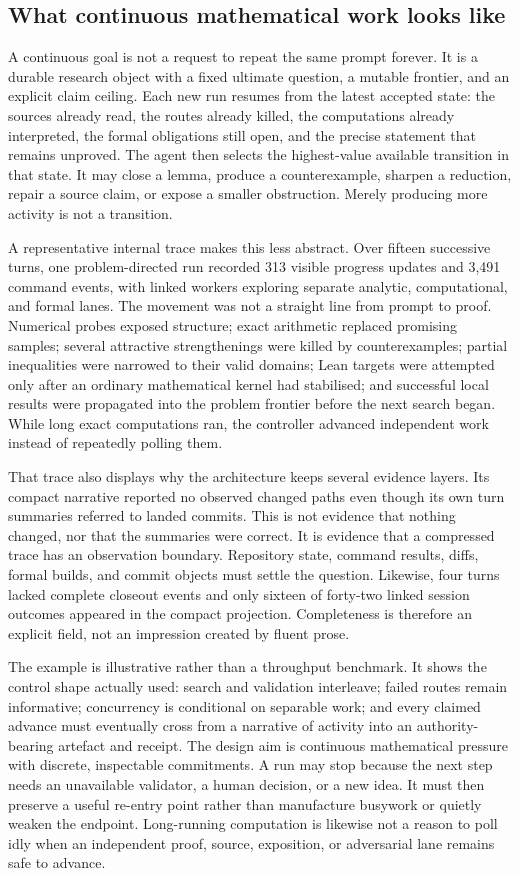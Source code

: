 \documentclass[10pt]{article}
\begin{document}
\subsection{What continuous mathematical work looks like}

A continuous goal is not a request to repeat the same prompt forever. It is a
durable research object with a fixed ultimate question, a mutable frontier,
and an explicit claim ceiling. Each new run resumes from the latest accepted
state: the sources already read, the routes already killed, the computations
already interpreted, the formal obligations still open, and the precise
statement that remains unproved. The agent then selects the highest-value
available transition in that state. It may close a lemma, produce a
counterexample, sharpen a reduction, repair a source claim, or expose a
smaller obstruction. Merely producing more activity is not a transition.

A representative internal trace makes this less abstract. Over fifteen
successive turns, one problem-directed run recorded 313 visible progress
updates and 3,491 command events, with linked workers exploring separate
analytic, computational, and formal lanes. The movement was not a straight
line from prompt to proof. Numerical probes exposed structure; exact arithmetic
replaced promising samples; several attractive strengthenings were killed by
counterexamples; partial inequalities were narrowed to their valid domains;
Lean targets were attempted only after an ordinary mathematical kernel had
stabilised; and successful local results were propagated into the problem
frontier before the next search began. While long exact computations ran, the
controller advanced independent work instead of repeatedly polling them.

That trace also displays why the architecture keeps several evidence layers.
Its compact narrative reported no observed changed paths even though its own
turn summaries referred to landed commits. This is not evidence that nothing
changed, nor that the summaries were correct. It is evidence that a compressed
trace has an observation boundary. Repository state, command results, diffs,
formal builds, and commit objects must settle the question. Likewise, four
turns lacked complete closeout events and only sixteen of forty-two linked
session outcomes appeared in the compact projection. Completeness is therefore
an explicit field, not an impression created by fluent prose.

The example is illustrative rather than a throughput benchmark. It shows the
control shape actually used: search and validation interleave; failed routes
remain informative; concurrency is conditional on separable work; and every
claimed advance must eventually cross from a narrative of activity into an
authority-bearing artefact and receipt. The design aim is continuous
mathematical pressure with discrete, inspectable commitments. A run may stop
because the next step needs an unavailable validator, a human decision, or a
new idea. It must then preserve a useful re-entry point rather than manufacture
busywork or quietly weaken the endpoint. Long-running computation is likewise
not a reason to poll idly when an independent proof, source, exposition, or
adversarial lane remains safe to advance.
\end{document}

